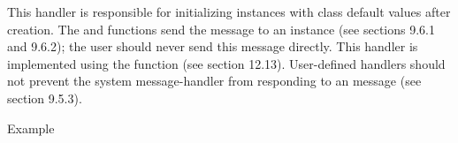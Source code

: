 \documentclass[letterpaper,10pt,english]{sphinxmanual}
\begin{document}
\begin{sphinxVerbatim}[commandchars=\\\{\}]
    
\end{sphinxVerbatim}

This handler is responsible for initializing instances with class
default values after creation. The  and
 functions send the  message to an
instance (see sections 9.6.1 and 9.6.2); the user should never send this
message directly. This handler is implemented using the 
function (see section 12.13). User-defined  handlers should not
prevent the system message-handler from responding to an 
message (see section 9.5.3).

Example
\end{document}
